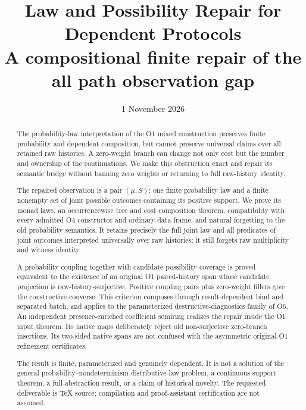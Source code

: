 \documentclass[11pt,a4paper]{article}
\title{Law and Possibility Repair for Dependent Protocols\\[5pt]
\large A compositional finite repair of the all path observation gap}
\author{}
\date{1 November 2026}
\theoremstyle{definition}
\begin{document}
\maketitle

\begin{abstract}
The probability-law interpretation of the O1 mixed construction preserves
finite probability and dependent composition, but cannot preserve universal
claims over all retained raw histories. A zero-weight branch can change
not only cost but the number and ownership of the continuations. We make
this obstruction exact and repair its semantic bridge without banning
zero weights or returning to full raw-history identity.

The repaired observation is a pair $(\mu,S)$: one finite probability law
and a finite nonempty set of joint possible outcomes containing its
positive support. We prove its monad laws, an occurrencewise tree and cost
composition theorem, compatibility with every admitted O4 constructor
and ordinary-data frame, and natural forgetting to the old probability
semantics. It retains precisely the full joint law and all predicates of
joint outcomes interpreted universally over raw histories; it still
forgets raw multiplicity and witness identity.

A probability coupling together with candidate possibility coverage is
proved equivalent to the existence of an original O1 paired-history span
whose candidate projection is raw-history-surjective. Positive coupling
pairs plus zero-weight fillers give the constructive converse. This
criterion composes through result-dependent bind and separated batch,
and applies to the parameterized destructive-diagnostics family of O6.
An independent presence-enriched coefficient semiring realizes the repair
inside the O1 input theorem. Its native maps deliberately reject old
non-surjective zero-branch insertions. Its two-sided native spans are not
confused with the asymmetric original-O1 refinement certificates.

The result is finite, parameterized and genuinely dependent. It is not a
solution of the general probability--nondeterminism distributive-law
problem, a continuous-support theorem, a full-abstraction result, or a
claim of historical novelty. The requested deliverable is TeX source;
compilation and proof-assistant certification are not assumed.
\end{abstract}
\tableofcontents
\end{document}
